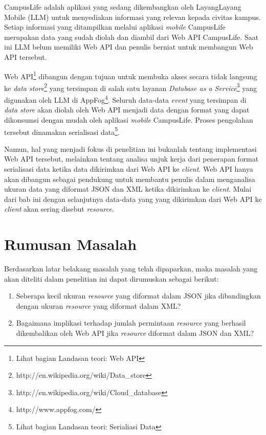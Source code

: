 \documentclass[a4paper, 12pt, oneside]{report}
\begin{document}
\onehalfspacing CampusLife adalah aplikasi yang sedang dikembangkan oleh LayangLayang Mobile (LLM) untuk menyediakan informasi yang relevan kepada civitas kampus. Setiap informasi yang ditampilkan melalui aplikasi \textit{mobile} CampusLife merupakan data yang sudah diolah dan diambil dari Web API CampusLife. Saat ini LLM belum memiliki Web API dan penulis berniat untuk membangun Web API tersebut.

Web API\footnote{Lihat bagian Landasan teori: Web API} dibangun dengan tujuan untuk membuka akses secara tidak langsung ke \textit{data store}\footnote{http://en.wikipedia.org/wiki/Data\_store} yang tersimpan di salah satu layanan \textit{Database as a Service}\footnote{http://en.wikipedia.org/wiki/Cloud\_database} yang digunakan oleh LLM di AppFog\footnote{http://www.appfog.com/}. Seluruh data-data \textit{event} yang tersimpan di \textit{data store} akan diolah oleh Web API menjadi data dengan format yang dapat dikonsumsi dengan mudah oleh aplikasi \textit{mobile} CampusLife. Proses pengolahan tersebut dinamakan serialisasi data\footnote{Lihat bagian Landasan teori: Serialiasi Data}.

\newpage
\onehalfspacing Namun, hal yang menjadi fokus di penelitian ini bukanlah tentang implementasi Web API tersebut, melainkan tentang analisa unjuk kerja dari penerapan format serialisasi data ketika data dikirimkan dari Web API ke \textit{client}. Web API hanya akan dibangun sebagai pendukung untuk membantu penulis dalam menganalisa ukuran data yang diformat JSON dan XML ketika dikirimkan ke \textit{client}. Mulai dari bab ini dengan selanjutnya data-data yang yang dikirimkan dari Web API ke \textit{client} akan sering disebut \textit{resource}. 

\section{Rumusan Masalah}
\onehalfspacing Berdasarkan latar belakang masalah yang telah dipaparkan, maka masalah yang akan diteliti dalam penelitian ini dapat dirumuskan sebagai berikut:
\begin{enumerate}
  \item Seberapa kecil ukuran \textit{resource} yang diformat dalam JSON jika dibandingkan dengan ukuran \textit{resource} yang diformat dalam XML? 
  \item Bagaimana implikasi terhadap jumlah permintaan  \textit{resource} yang berhasil dikembalikan oleh Web API jika \textit{resource} diformat dalam JSON dan XML?
\end{enumerate}
\end{document}

